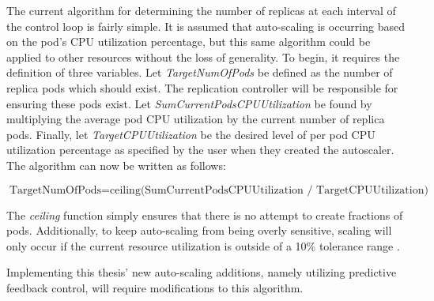 The current algorithm for determining the number of replicas at each interval
of the control loop is fairly simple. It is assumed that auto-scaling is
occurring based on the pod's CPU utilization percentage, but this same algorithm
could be applied to other resources without the loss of generality.
To begin, it requires the definition of
three variables. Let \textit{TargetNumOfPods} be defined as the number of
replica pods which should exist. The replication controller will be responsible
for ensuring these pods exist. Let \textit{SumCurrentPodsCPUUtilization} be
found by multiplying the average pod CPU utilization by the current number of
replica pods. Finally, let \textit{TargetCPUUtilization} be the desired level of
per pod CPU utilization percentage as specified by the user when they created
the autoscaler. The algorithm can now be written as follows:

\[ \mbox{TargetNumOfPods} = \mbox{ceiling(SumCurrentPodsCPUUtilization /
TargetCPUUtilization)} \]

The \textit{ceiling} function simply ensures that there is no attempt to create
fractions of pods. Additionally, to keep auto-scaling from being overly
sensitive, scaling will only occur if the current resource utilization is
outside of a 10\% tolerance range \cite{k8s-horizontal-pod-autoscaler-proposal}.

Implementing this thesis' new auto-scaling additions, namely utilizing
predictive feedback control, will require modifications to this algorithm.
